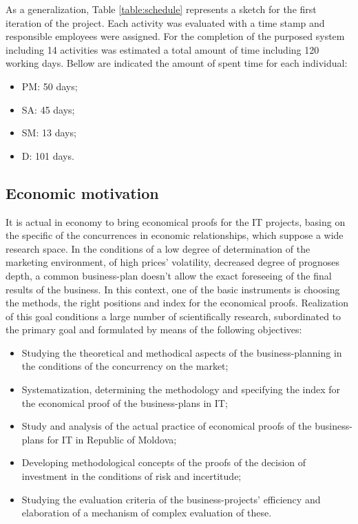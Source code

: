  As a generalization, Table \ref{table:schedule} represents a sketch for the first iteration of the project. Each activity was evaluated with a time stamp and responsible employees were assigned. For the completion of the purposed system including 14 activities was estimated a total amount of time including 120 working days. Bellow are indicated the amount of spent time for each individual:
 \begin{itemize}
\item PM: 50 days; 
\item SA:  45 days; 
\item SM: 13 days;
\item D: 101 days.
 \end{itemize}

\subsection{Economic motivation}
It is actual in economy to bring economical proofs for the IT projects, basing on the specific of the concurrences in economic relationships, which suppose a wide research space. In the conditions of a low degree of determination of the marketing environment, of high prices' volatility, decreased degree of prognoses depth, a common business-plan doesn't allow the exact foreseeing of the final results of the business. In this context, one of the basic instruments is choosing the methods, the right positions and index for the economical proofs.
Realization of this goal conditions a large number of scientifically research, subordinated to the primary goal and formulated by means of the following objectives:
\begin{itemize}
\item Studying the theoretical and methodical aspects of the business-planning in the conditions of the concurrency on the market;
\item  Systematization, determining the methodology and specifying the index for the economical proof of the business-plans in IT;
\item  Study and analysis of the actual practice of economical proofs of the business-plans for IT in Republic of Moldova;
\item  Developing methodological concepts of the proofs of the decision of investment in the conditions of risk and incertitude;
\item  Studying the evaluation criteria of the business-projects' efficiency and elaboration of a mechanism of complex evaluation of these.
\end{itemize}

